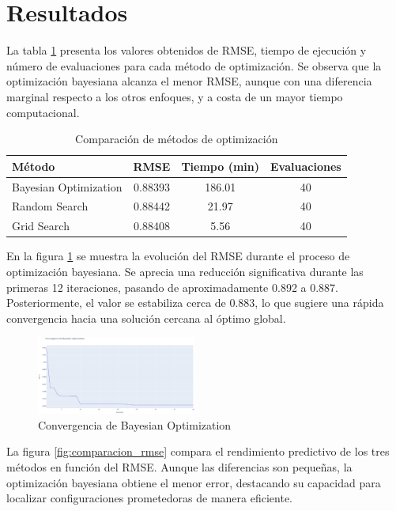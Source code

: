 \documentclass[twocolumn,10pt]{article}
\begin{document}
\section{Resultados}
La tabla \ref{tabla:resultados} presenta los valores obtenidos de RMSE, tiempo de ejecución y número de evaluaciones para cada método de optimización. Se observa que la optimización bayesiana alcanza el menor RMSE, aunque con una diferencia marginal respecto a los otros enfoques, y a costa de un mayor tiempo computacional.
\begin{table}[H]
\centering
\caption{Comparación de métodos de optimización}
\label{tabla:resultados}
\small
\begin{tabularx}{\linewidth}{Xccc}
\toprule
\textbf{Método} & \textbf{RMSE} & \textbf{Tiempo (min)} & \textbf{Evaluaciones} \\
\midrule
Bayesian Optimization & 0.88393 & 186.01 & 40 \\
Random Search & 0.88442 & 21.97 & 40 \\
Grid Search & 0.88408 & 5.56 & 40 \\
\bottomrule
\end{tabularx}
\end{table}
En la figura \ref{fig:convergencia_bo} se muestra la evolución del RMSE durante el proceso de optimización bayesiana. Se aprecia una reducción significativa durante las primeras 12 iteraciones, pasando de aproximadamente 0.892 a 0.887. Posteriormente, el valor se estabiliza cerca de 0.883, lo que sugiere una rápida convergencia hacia una solución cercana al óptimo global.

\begin{figure}[H]
\centering
\includegraphics[width=0.47\textwidth]{fig_convergencia_bo.png}
\caption{Convergencia de Bayesian Optimization}
\label{fig:convergencia_bo}
\end{figure}

La figura \ref{fig:comparacion_rmse} compara el rendimiento predictivo de los tres métodos en función del RMSE. Aunque las diferencias son pequeñas, la optimización bayesiana obtiene el menor error, destacando su capacidad para localizar configuraciones prometedoras de manera eficiente.
\end{document}
